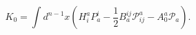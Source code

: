 \begin{equation}
K_{0}=\int d^{n-1}x\left( H_{i}^{a}P_{a}^{i}-\frac{1}{2}B_{a}^{ij}\mathcal{P}%
_{ij}^{a}-A_{0}^{a}\mathcal{P}_{a}\right) .  \label{f32}
\end{equation}

